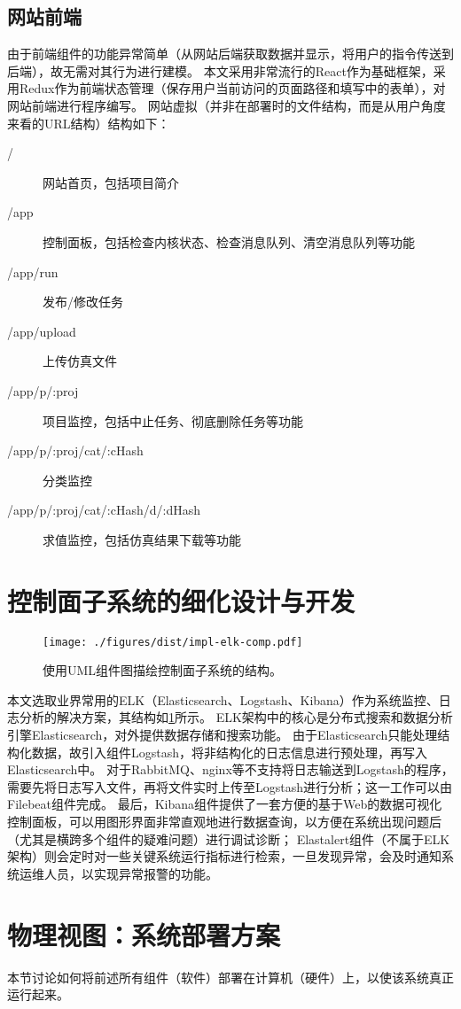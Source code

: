 \documentclass[index]{subfiles}
\begin{document}
\subsection{网站前端}
由于前端组件的功能异常简单（从网站后端获取数据并显示，将用户的指令传送到后端），故无需对其行为进行建模。
本文采用非常流行的React作为基础框架，采用Redux作为前端状态管理（保存用户当前访问的页面路径和填写中的表单），对网站前端进行程序编写。
网站虚拟（并非在部署时的文件结构，而是从用户角度来看的URL结构）结构如下：
\begin{description}
  \item[/] 网站首页，包括项目简介
  \item[/app] 控制面板，包括检查内核状态、检查消息队列、清空消息队列等功能
  \item[/app/run] 发布/修改任务
  \item[/app/upload] 上传仿真文件
  \item[/app/p/:proj] 项目监控，包括中止任务、彻底删除任务等功能
  \item[/app/p/:proj/cat/:cHash] 分类监控
  \item[/app/p/:proj/cat/:cHash/d/:dHash] 求值监控，包括仿真结果下载等功能
\end{description}

\section{控制面子系统的细化设计与开发}\label{sec:impl-elk}
\begin{figure}[h]
  \centering
  \texttt{[image: ./figures/dist/impl-elk-comp.pdf]}
  \caption[控制面子系统的结构]{使用UML组件图描绘控制面子系统的结构。\label{fig:impl-elk-comp}}
\end{figure}
本文选取业界常用的ELK（Elasticsearch、Logstash、Kibana）作为系统监控、日志分析的解决方案，其结构如\cref{fig:impl-elk-comp}所示。
ELK架构中的核心是分布式搜索和数据分析引擎Elasticsearch，对外提供数据存储和搜索功能。
由于Elasticsearch只能处理结构化数据，故引入组件Logstash，将非结构化的日志信息进行预处理，再写入Elasticsearch中。
对于RabbitMQ、nginx等不支持将日志输送到Logstash的程序，需要先将日志写入文件，再将文件实时上传至Logstash进行分析；这一工作可以由Filebeat组件完成。
最后，Kibana组件提供了一套方便的基于Web的数据可视化控制面板，可以用图形界面非常直观地进行数据查询，以方便在系统出现问题后（尤其是横跨多个组件的疑难问题）进行调试诊断；
Elastalert组件（不属于ELK架构）则会定时对一些关键系统运行指标进行检索，一旦发现异常，会及时通知系统运维人员，以实现异常报警的功能。

\section{物理视图：系统部署方案}
本节讨论如何将前述所有组件（软件）部署在计算机（硬件）上，以使该系统真正运行起来。
\end{document}
